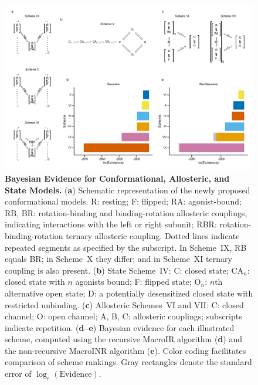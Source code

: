 \documentclass[pdflatex,sn-nature]{sn-jnl}%
\begin{document}
\begin{figure}[t]
	\centering
	\includegraphics[width=\linewidth]{Figure_1.pdf}
	\caption{\textbf{Bayesian Evidence for Conformational, Allosteric, and State Models.}  
		(\textbf{a}) Schematic representation of the newly proposed conformational models. R: resting; F: flipped; RA: agonist-bound; RB, BR: rotation-binding and binding-rotation allosteric couplings, indicating interactions with the left or right subunit; RBR: rotation-binding-rotation ternary allosteric coupling. Dotted lines indicate repeated segments as specified by the subscript. In Scheme~IX, RB equals BR; in Scheme~X they differ; and in Scheme~XI ternary coupling is also present.  
		(\textbf{b}) State Scheme~IV: C: closed state; CA$_n$: closed state with $n$ agonists bound; F: flipped state; O$_n$: $n$th alternative open state; D: a potentially desensitized closed state with restricted unbinding.  
		(\textbf{c}) Allosteric Schemes~VI and VII: C: closed channel; O: open channel; A, B, C: allosteric couplings; subscripts indicate repetition.  
		(\textbf{d--e}) Bayesian evidence for each illustrated scheme, computed using the recursive MacroIR algorithm (\textbf{d}) and the non-recursive MacroINR algorithm (\textbf{e}). Color coding facilitates comparison of scheme rankings. Gray rectangles denote the standard error of $\log_e(\text{Evidence})$.  
	}
	\label{fig:figure1}
\end{figure}
\end{document}
